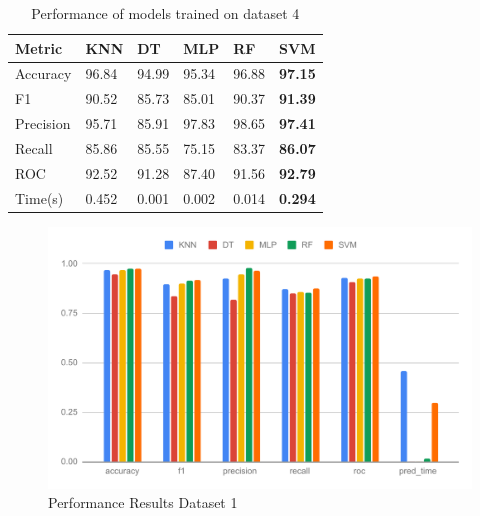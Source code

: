 \begin{table}[hbt]
\caption{Performance of models trained on dataset 4} \label{tab:performance_of_models_trained_on_dataset_4}
\begin{tabular*}{\tblwidth}{@{}LLLLLL@{}}
    \toprule
    Metric & KNN & DT & MLP & RF & \textbf{SVM} \\
    \midrule
    Accuracy & 96.84 & 94.99 & 95.34 & 96.88 & \textbf{97.15} \\
    F1 & 90.52 & 85.73 & 85.01 & 90.37 & \textbf{91.39} \\
    Precision & 95.71 & 85.91 & 97.83 & 98.65 & \textbf{97.41} \\
    Recall & 85.86 & 85.55 & 75.15 & 83.37 & \textbf{86.07} \\
    ROC & 92.52 & 91.28 & 87.40 & 91.56 & \textbf{92.79} \\
    Time(s) & 0.452 & 0.001 & 0.002 & 0.014 & \textbf{0.294} \\
    \bottomrule
\end{tabular*}
\end{table}

\begin{figure}[ht]
    \centering
    \includegraphics[width=1.9\columnwidth]{media/ch_result_and_testing/perf_ds_1.pdf}
    \caption{Performance Results Dataset 1} \label{fig:perfromance_results_dataset_1}
\end{figure}

